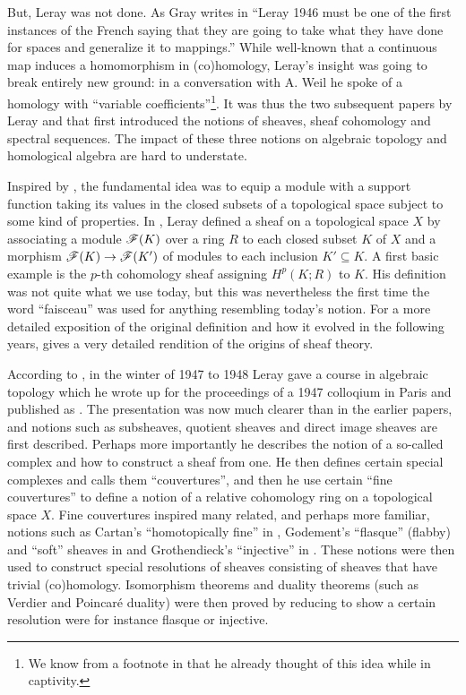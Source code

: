 \documentclass[../../thesis.tex]{subfiles}
\begin{document}
But, Leray was not done.
As Gray writes in \cite{Gray} ``Leray 1946 must be one of the first instances of the French saying that they are going to take what they have done for spaces and generalize it to mappings.''
While well-known that a continuous map induces a homomorphism in (co)homology, Leray's insight was going to break entirely new ground: in a conversation with A. Weil \cite{BorelAMS} he spoke of a homology with ``variable coefficients''\footnote{We know from a footnote in \cite{Leray45c2} that he already thought of this idea while in captivity.}.
It was thus the two subsequent papers by Leray \cite{Leray46a} and \cite{Leray46b} that first introduced the notions of sheaves, sheaf cohomology and spectral sequences.
The impact of these three notions on algebraic topology and homological algebra are hard to understate.


Inspired by \cite{Alexander}, the fundamental idea was to equip a module with a support function taking its values in the closed subsets of a topological space subject to some kind of properties.
In \cite{Leray46a}, Leray defined a sheaf on a topological space $X$ by associating a module $\mathscr{F}(K)$ over a ring $R$ to each closed subset $K$ of $X$ and a morphism $\mathscr{F}(K) \to \mathscr{F}(K')$ of modules to each inclusion $K' \subseteq K$.
A first basic example is the $p$-th cohomology sheaf assigning $H^p(K ; R)$ to $K$.
His definition was not quite what we use today, but this was nevertheless the first time the word ``faisceau'' was used for anything resembling today's notion.
For a more detailed exposition of the original definition and how it evolved in the following years, \cite{Gray} gives a very detailed rendition of the origins of sheaf theory.


According to \cite{Gray}, in the winter of 1947 to 1948 Leray gave a course in algebraic topology which he wrote up for the proceedings of a 1947 colloqium in Paris and published as \cite{Leray49}.
The presentation was now much clearer than in the earlier papers, and notions such as subsheaves, quotient sheaves and direct image sheaves are first described.
Perhaps more importantly he describes the notion of a so-called complex and how to construct a sheaf from one.
He then defines certain special complexes and calls them ``couvertures'', and then he use certain ``fine couvertures'' to define a notion of a relative cohomology ring on a topological space $X$.
Fine couvertures inspired many related, and perhaps more familiar, notions such as Cartan's ``homotopically fine'' in \cite{Cartan_50_4}, Godement's ``flasque'' (flabby) and ``soft'' sheaves in \cite{Godement58} and Grothendieck's ``injective'' in \cite{Grothendieck57}.
These notions were then used to construct special resolutions of sheaves consisting of sheaves that have trivial (co)homology.
Isomorphism theorems and duality theorems (such as Verdier and Poincaré duality) were then proved by reducing to show a certain resolution were for instance flasque or injective.
\end{document}

